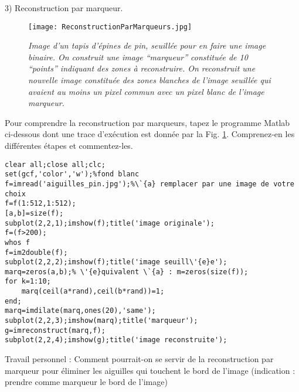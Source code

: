 \documentclass[12pt]{article}
\begin{document}
\begin{center}
\Large{3) Reconstruction par marqueur.}
\end{center}


\bigskip

\normalsize

\begin{figure}[H]
\begin{center}
\texttt{[image: ReconstructionParMarqueurs.jpg]}
\caption{\textit{Image d'un tapis d'\'{e}pines de pin, seuill\'{e}e pour en faire une image binaire. On construit une image ``marqueur'' constitu\'{e}e de 10 ``points'' indiquant des zones \`{a} reconstruire. On reconstruit une nouvelle image constitu\'{e}e des zones blanches de l'image seuill\'{e}e qui avaient au moins un pixel commun avec un pixel blanc de l'image marqueur.}}
\label{rpm}
\end{center}
\end{figure}%

\newpage

Pour comprendre la reconstruction par marqueurs, tapez le programme Matlab ci-dessous dont une trace d'ex\'{e}cution est donn\'{e}e par la Fig. \ref{rpm}. Comprenez-en les diff\'{e}rentes \'{e}tapes et commentez-les.

\begin{verbatim}
clear all;close all;clc;
set(gcf,'color','w');%fond blanc
f=imread('aiguilles_pin.jpg');%\`{a} remplacer par une image de votre choix
f=f(1:512,1:512);
[a,b]=size(f);
subplot(2,2,1);imshow(f);title('image originale');
f=(f>200);
whos f
f=im2double(f);
subplot(2,2,2);imshow(f);title('image seuill\'{e}e');
marq=zeros(a,b);% \'{e}quivalent \`{a} : m=zeros(size(f));
for k=1:10;
    marq(ceil(a*rand),ceil(b*rand))=1;
end;
marq=imdilate(marq,ones(20),'same');
subplot(2,2,3);imshow(marq);title('marqueur');
g=imreconstruct(marq,f);
subplot(2,2,4);imshow(g);title('image reconstruite');
\end{verbatim}

\bigskip

Travail personnel : Comment pourrait-on se servir de la reconstruction par marqueur pour \'{e}liminer les aiguilles qui touchent le bord de l'image (indication : prendre comme marqueur le bord de l'image)
\end{document}
